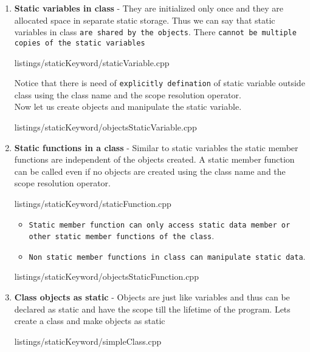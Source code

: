\documentclass[oops.tex]{subfiles}
\begin{document}
\begin{enumerate}
    \item {\bf Static variables in class} - They are initialized only once
          and they are allocated space in separate static storage. Thus we can
          say that static variables in class \texttt{are shared by the objects}.
          There \texttt{cannot be multiple copies of the static variables}
          
          {listings/staticKeyword/staticVariable.cpp}

          Notice that there is need of \texttt{explicitly defination} of static 
          variable outside class using the class name and the scope resolution
          operator.\\
          Now let us create objects and manipulate the static variable.
          
          {listings/staticKeyword/objectsStaticVariable.cpp}

    \item {\bf Static functions in a class} - Similar to static variables the
          static member functions are independent of the objects created. A
          static member function can be called even if no objects are created
          using the class name and the scope resolution operator.
          
          {listings/staticKeyword/staticFunction.cpp}

          \begin{itemize}
            \item   \texttt{Static member function can only access static data 
                    member or other static member functions of the class}. 
            \item   \texttt{Non static member functions in class 
                    can manipulate static data}.
          \end{itemize}
           
          {listings/staticKeyword/objectsStaticFunction.cpp}
    
    \item {\bf Class objects as static} - Objects are just like variables and
          thus can be declared as static and have the scope till the lifetime
          of the program. Lets create a class and make objects as static
           
          {listings/staticKeyword/simpleClass.cpp}


\end{enumerate}
\end{document}
